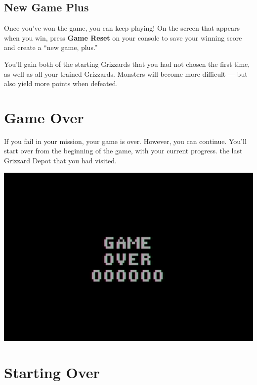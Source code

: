 \documentclass[10pt,twocolumn,openany,article]{memoir}
\begin{document}
\subsection*{New Game Plus}\label{sec:NewGamePlus}

Once  you've won  the game,  you can  keep playing!  On the  screen that
appears when you win, press \textbf{Game  Reset} on your console to save
your winning score and create a ``new game, plus.''

You'll gain both  of the starting Grizzards that you  had not chosen the
first time, as well as all  your trained Grizzards. Monsters will become
more difficult — but also yield more points when defeated.

\section{Game Over}

If  you fail  in  your mission,  your  game is  over.  However, you  can
continue. You'll start over from  \ifdefined\NOSAVE the beginning of the
game, with your current progress. \else the last Grizzard Depot that you
had visited. \fi

\begin{center}
  \includegraphics[width=\columnwidth]{../Manual/GameOverNTSC.png}
\end{center}

\section{Starting Over}\label{Starting Your Adventure Over}

\ifdefined\NOSAVE
\end{document}
